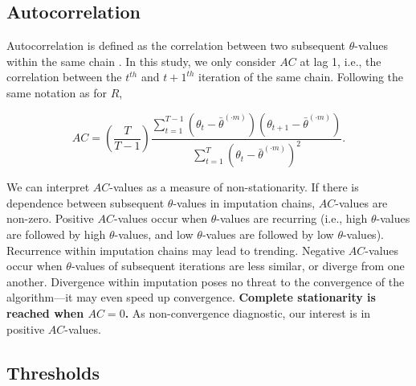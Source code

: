 \documentclass[Royal,times,sageh]{sagej}
\begin{document}
\hypertarget{autocorrelation}{%
\subsection{Autocorrelation}\label{autocorrelation}}

Autocorrelation is defined as the correlation between two subsequent \(\theta\)-values within the same chain \citep[p.~147]{lync07}. In this study, we only consider \(AC\) at lag 1, i.e., the correlation between the \(t^{th}\) and \(t+1^{th}\) iteration of the same chain. Following the same notation as for \(\widehat{R}\),

\begin{equation*}
AC = \left( \frac{T}{T-1} \right) \frac{\sum_{t=1}^{T-1}(\theta_t - \bar{\theta}^{(\cdot m)})(\theta_{t+1} - \bar{\theta}^{(\cdot m)})}{\sum_{t=1}^{T}(\theta_t - \bar{\theta}^{(\cdot m)})^2}.
\end{equation*}

We can interpret \(AC\)-values as a measure of non-stationarity. If there is dependence between subsequent \(\theta\)-values in imputation chains, \(AC\)-values are non-zero. Positive \(AC\)-values occur when \(\theta\)-values are recurring (i.e., high \(\theta\)-values are followed by high \(\theta\)-values, and low \(\theta\)-values are followed by low \(\theta\)-values). Recurrence within imputation chains may lead to trending. Negative \(AC\)-values occur when \(\theta\)-values of subsequent iterations are less similar, or diverge from one another. Divergence within imputation poses no threat to the convergence of the algorithm---it may even speed up convergence. \textbf{Complete stationarity is reached when \(AC=0\).} As non-convergence diagnostic, our interest is in positive \(AC\)-values.

\hypertarget{thresholds}{%
\subsection{Thresholds}\label{thresholds}}
\end{document}
